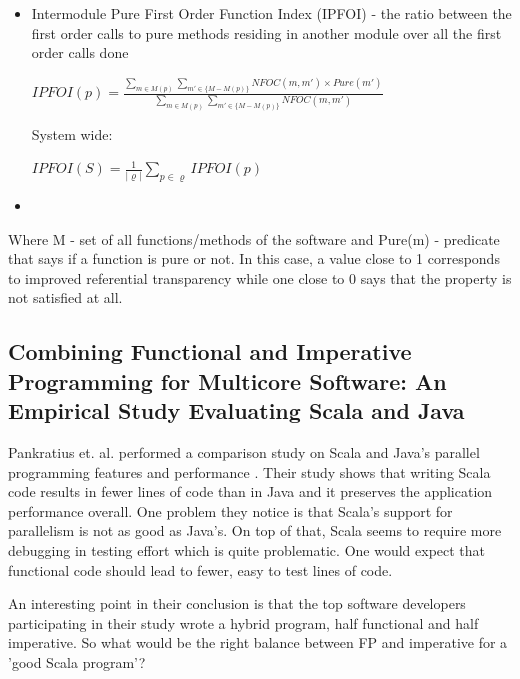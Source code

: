 \documentclass{article}
\begin{document}
\begin{itemize}
\item Intermodule Pure First Order Function Index (IPFOI) - the ratio between the first order calls to pure methods residing in another module over all the first order calls done
\begin{center}
  $IPFOI(p) = \frac { \sum_{m \in M(p)} \sum_{m' \in \{M-M(p) \}} NFOC(m,m') \times Pure(m') } { \sum_{m \in M(p)} \sum_{m' \in \{M - M(p)\}} NFOC(m,m') } $ 
\end{center}

System wide:

\begin{center}
$IPFOI(S) = \frac 1 {|\varrho|} \sum_{ p \in \varrho } IPFOI(p)  $
\end{center}

\item 
\end{itemize}



Where  M - set of all functions/methods of the software and  Pure(m) - predicate that says if a function is pure or not. In this case, a value close to 1 corresponds to improved referential transparency while one close to 0 says that the property is not satisfied at all. \par






\subsection {Combining Functional and Imperative Programming for Multicore Software: An Empirical Study Evaluating Scala and Java}
Pankratius et. al. performed a comparison study on Scala and Java's parallel programming features and performance \cite{Pankratius_combiningfunctional}. Their study shows that writing Scala code results in fewer lines of code than in Java and it preserves the application performance overall. One problem they notice is that Scala's support for parallelism is not as good as Java's. On top of that, Scala seems to require more debugging in testing effort which is quite problematic. One would expect that functional code should lead to fewer, easy to test lines of code. \par

An interesting point in their conclusion is that the top software developers participating in their study wrote a hybrid program, half functional and half imperative. So what would be the right balance between FP and imperative for a 'good Scala program'? \par
\end{document}
